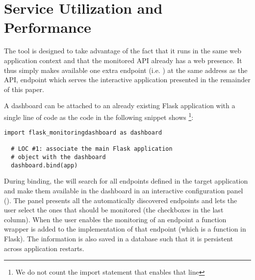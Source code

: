 

  \newpage
  \section{Service Utilization and Performance}


  The tool is designed to take advantage of the fact that it runs in the same web application context and that the monitored API already has a web presence. It thus simply makes available one extra endpoint (i.e. ) at the same address as the API, endpoint which serves the interactive application presented in the remainder of this paper. 

  A dashboard can be attached to an already existing Flask application with a single line of code as the code in the following snippet shows
  \footnote{We do not count the import statement that enables that line}:


  \begin{lstlisting}[style=custompython]
  import flask_monitoringdashboard as dashboard

  # LOC #1: associate the main Flask application 
  # object with the dashboard
  dashboard.bind(app) 

  \end{lstlisting}

  During binding, the \tool will search for all endpoints defined in the target application and make them available in the dashboard in an interactive configuration panel (). The panel presents all the automatically discovered endpoints and lets the user select the ones that should be monitored (the checkboxes in the last column). When the user enables the monitoring of an endpoint a function wrapper is added to the implementation of that endpoint (which is a function in Flask). The information is also saved in a database such that it is persistent across application restarts. 

